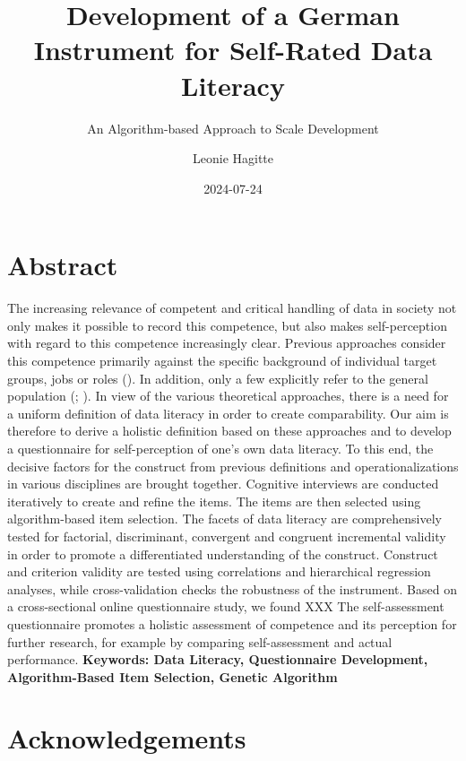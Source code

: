 \documentclass[
  12pt,
  a4paper,
  twoside]{article}
\title{Development of a German Instrument for Self-Rated Data Literacy}
\subtitle{An Algorithm-based Approach to Scale Development}
\author{Leonie Hagitte}
\date{2024-07-24}
\begin{document}
\maketitle

{
\setcounter{tocdepth}{2}
\tableofcontents
}
\newpage\null\thispagestyle{empty}\newpage

\section*{Abstract}\label{abstract}

The increasing relevance of competent and critical handling of data in society not only makes it possible to record this competence, but also makes self-perception with regard to this competence increasingly clear. Previous approaches consider this competence primarily against the specific background of individual target groups, jobs or roles (). In addition, only a few explicitly refer to the general population (; ). In view of the various theoretical approaches, there is a need for a uniform definition of data literacy in order to create comparability.
Our aim is therefore to derive a holistic definition based on these approaches and to develop a questionnaire for self-perception of one's own data literacy. To this end, the decisive factors for the construct from previous definitions and operationalizations in various disciplines are brought together. Cognitive interviews are conducted iteratively to create and refine the items. The items are then selected using algorithm-based item selection. The facets of data literacy are comprehensively tested for factorial, discriminant, convergent and congruent incremental validity in order to promote a differentiated understanding of the construct. Construct and criterion validity are tested using correlations and hierarchical regression analyses, while cross-validation checks the robustness of the instrument.
Based on a cross-sectional online questionnaire study, we found XXX
The self-assessment questionnaire promotes a holistic assessment of competence and its perception for further research, for example by comparing self-assessment and actual performance.
\textbf{Keywords: Data Literacy, Questionnaire Development, Algorithm-Based Item Selection, Genetic Algorithm}

\section*{Acknowledgements}\label{acknowledgements}
\end{document}
